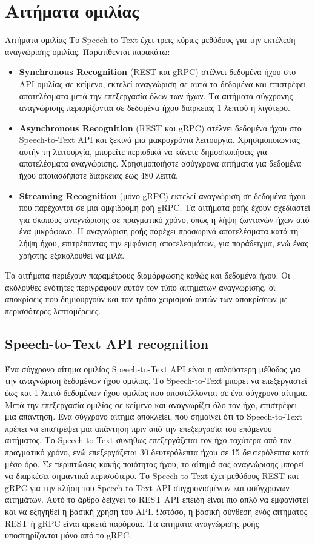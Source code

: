 \documentclass[oneside, 12pt]{book}
\begin{document}
\section{Αιτήματα ομιλίας}
\label{sec:αιτήματα-ομιλίας}
Αιτήματα ομιλίας
Το Speech-to-Text έχει τρεις κύριες μεθόδους για την εκτέλεση αναγνώρισης ομιλίας.
Παρατίθενται παρακάτω:
\begin{itemize}
  \item \textbf{Synchronous Recognition} (REST και gRPC) στέλνει δεδομένα ήχου στο API ομιλίας σε
  κείμενο, εκτελεί αναγνώριση σε αυτά τα δεδομένα και επιστρέφει αποτελέσματα μετά την επεξεργασία
  όλων των ήχων.
  Τα αιτήματα σύγχρονης αναγνώρισης περιορίζονται σε δεδομένα ήχου διάρκειας 1 λεπτού ή λιγότερο.
  \item \textbf{Asynchronous Recognition} (REST και gRPC) στέλνει δεδομένα ήχου στο Speech-to-Text
  API και ξεκινά μια μακροχρόνια λειτουργία.
  Χρησιμοποιώντας αυτήν τη λειτουργία, μπορείτε περιοδικά να κάνετε δημοσκοπήσεις για αποτελέσματα
  αναγνώρισης.
  Χρησιμοποιήστε ασύγχρονα αιτήματα για δεδομένα ήχου οποιασδήποτε διάρκειας έως 480 λεπτά.
  \item \textbf{Streaming Recognition} (μόνο gRPC) εκτελεί αναγνώριση σε δεδομένα ήχου που
  παρέχονται σε μια αμφίδρομη ροή gRPC. Τα αιτήματα ροής έχουν σχεδιαστεί για σκοπούς αναγνώρισης σε
  πραγματικό χρόνο, όπως η λήψη ζωντανών ήχων από ένα μικρόφωνο. Η αναγνώριση ροής παρέχει προσωρινά
  αποτελέσματα κατά τη λήψη ήχου, επιτρέποντας την εμφάνιση αποτελεσμάτων, για παράδειγμα, ενώ ένας
  χρήστης εξακολουθεί να μιλά.
\end{itemize}
Τα αιτήματα περιέχουν παραμέτρους διαμόρφωσης καθώς και δεδομένα ήχου.
Οι ακόλουθες ενότητες περιγράφουν αυτόν τον τύπο αιτημάτων αναγνώρισης, οι αποκρίσεις που
δημιουργούν και τον τρόπο χειρισμού αυτών των αποκρίσεων με περισσότερες λεπτομέρειες.
\subsection{Speech-to-Text API recognition}
\label{subsec:speech-to-text-api-recognition}
Ένα σύγχρονο αίτημα ομιλίας Speech-to-Text API είναι η απλούστερη μέθοδος για την αναγνώριση δεδομένων ήχου ομιλίας. Το Speech-to-Text μπορεί να επεξεργαστεί έως και 1 λεπτό δεδομένων ήχου ομιλίας που αποστέλλονται σε ένα σύγχρονο αίτημα. Μετά την επεξεργασία ομιλίας σε κείμενο και αναγνωρίζει όλο τον ήχο, επιστρέφει μια απάντηση.
Ένα σύγχρονο αίτημα αποκλείει, που σημαίνει ότι το Speech-to-Text πρέπει να επιστρέψει μια απάντηση πριν από την επεξεργασία του επόμενου αιτήματος. Το Speech-to-Text συνήθως επεξεργάζεται τον ήχο ταχύτερα από τον πραγματικό χρόνο, ενώ επεξεργάζεται 30 δευτερόλεπτα ήχου σε 15 δευτερόλεπτα κατά μέσο όρο. Σε περιπτώσεις κακής ποιότητας ήχου, το αίτημά σας αναγνώρισης μπορεί να διαρκέσει σημαντικά περισσότερο.
Το Speech-to-Text έχει μεθόδους REST και gRPC για την κλήση του Speech-to-Text API συγχρονισμένων και ασύγχρονων αιτημάτων. Αυτό το άρθρο δείχνει το REST API επειδή είναι πιο απλό να εμφανιστεί και να εξηγηθεί η βασική χρήση του API. Ωστόσο, η βασική σύνθεση ενός αιτήματος REST ή gRPC είναι αρκετά παρόμοια. Τα αιτήματα αναγνώρισης ροής υποστηρίζονται μόνο από το gRPC.
\end{document}
